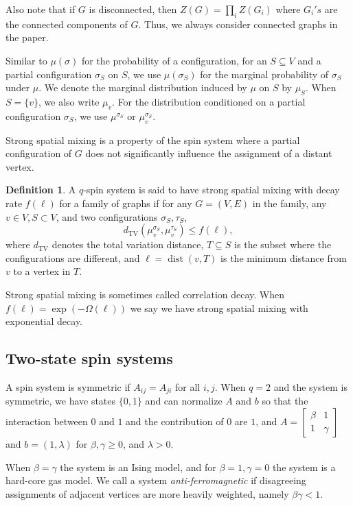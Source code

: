 \documentclass[11pt,a4paper]{amsart}
\newcommand{\dist}{\operatorname{dist}}
\theoremstyle{definition}
\newtheorem{definition}[theorem]{Definition}
\theoremstyle{remark}
\newcommand{\dTV}{d_{\mathrm{TV}}}
\begin{document}
Also note that if $G$ is disconnected, then $Z(G)=\prod_{i}Z(G_i)$ where $G_i's$ are the connected components of $G$.
Thus, we always consider connected graphs in the paper.

Similar to $\mu(\sigma)$ for the probability of a configuration, for an $S\subseteq V$ and a partial configuration $\sigma_S$ on $S$, we use $\mu(\sigma_S)$ for the marginal probability of $\sigma_S$ under $\mu$.
We denote the marginal distribution induced by $\mu$ on $S$ by $\mu_S$.
When $S=\{v\}$, we also write $\mu_v$. For the distribution conditioned on a partial configuration $\sigma_S$, we use $\mu^{\sigma_S}$ or $\mu_v^{\sigma_S}$. 

Strong spatial mixing is a property of the spin system where a partial configuration of $G$ does not significantly influence the assignment of a distant vertex. 

\begin{definition}\label{def:SSM}
A $q$-spin system is said to have strong spatial mixing with decay rate $f(\ell)$ for a family of graphs if for any $G=(V,E)$ in the family, any $v\in V, S\subset V$, and two configurations $\sigma_S,\tau_S$,
\[\dTV(\mu_v^{\sigma_S},\mu_v^{\tau_S})\leq f(\ell),\]
where $\dTV$ denotes the total variation distance, $T\subseteq S$ is the subset where the configurations are different, and $\ell=\dist(v,T)$ is the minimum distance from $v$ to a vertex in $T$. 
\end{definition}

Strong spatial mixing is sometimes called correlation decay. When $f(\ell)=\exp(-\Omega(\ell))$ we say we have strong spatial mixing with exponential decay. 

\subsection{Two-state spin systems}

A spin system is symmetric if $A_{ij}=A_{ji}$ for all $i,j$. %
When $q=2$ and the system is symmetric, we have states $\{0,1\}$ and can normalize $A$ and $b$ so that the interaction between $0$ and $1$ and the contribution of $0$ are $1$, and $A=
\begin{bmatrix}
\beta & 1\\
1 & \gamma
\end{bmatrix}$ and $b=(1,\lambda)$ for $\beta,\gamma\geq0$, and $\lambda>0$. 

When $\beta=\gamma$ the system is an Ising model, and for $\beta=1, \gamma=0$ the system is a hard-core gas model. We call a system \emph{anti-ferromagnetic} if disagreeing assignments of adjacent vertices are more heavily weighted, namely $\beta\gamma<1$. 
\end{document}
